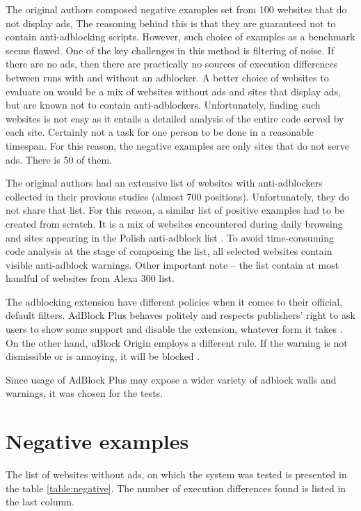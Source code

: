 The original authors composed negative examples set from 100 websites that do not display ads,
The reasoning behind this is that they are guaranteed not to contain anti-adblocking scripts.
However, such choice of examples as a benchmark seems flawed.
One of the key challenges in this method is filtering of noise. If there are no ads, 
then there are practically no sources of execution differences between runs with and without an adblocker.
A better choice of websites to evaluate on would be a mix of websites without ads and sites that
display ads, but are known not to contain anti-adblockers.
Unfortunately, finding such websites is not easy as it entails a detailed analysis of the entire code
served by each site. Certainly not a task for one person to be done in a reasonable timespan.
For this reason, the negative examples are only sites that do not serve ads. There is 50 of them.

The original authors had an extensive list of websites with anti-adblockers collected in their
previous studies (almost 700 positions). Unfortunately, they do not share that list. 
For this reason, a similar list of positive examples had to be created from scratch.
It is a mix of websites encountered during daily browsing and sites appearing in the
Polish anti-adblock list \cite{github:anti-adblock-list}.
To avoid time-consuming code analysis at the stage of composing the list, 
all selected websites contain visible anti-adblock warnings.
Other important note -- the list contain at most handful of websites from Alexa 300 list.

The adblocking extension have different policies when it comes to their official, default filters.
AdBlock Plus behaves politely and respects publishers' right to ask users to show some support
and disable the extension, whatever form it takes \cite{adblock:policy}.
On the other hand, uBlock Origin employs a different rule. If the warning is not dismissible or is annoying,
it will be blocked \cite{vice:ublock-policy}.

Since usage of AdBlock Plus may expose a wider variety of adblock walls and warnings, it was chosen for the tests.

\section{Negative examples}

The list of websites without ads, on which the system was tested is presented in the table \ref{table:negative}.
The number of execution differences found is listed in the last column.

